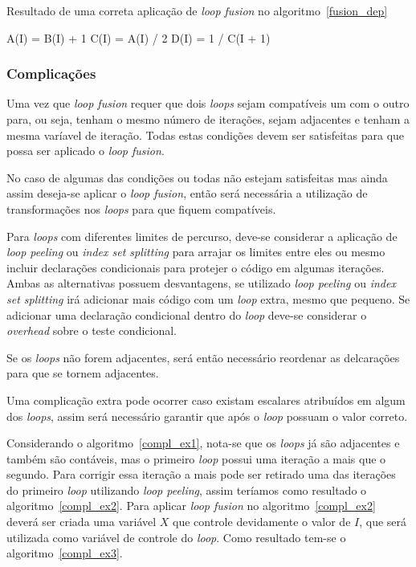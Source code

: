 \begin{algorithm}
\caption{Resultado de uma correta aplicação de \textit{loop fusion} no 
        algoritmo~\ref{fusion_dep}} 
\label{fusion_dep3}
\begin{algorithmic}[1]

\STATE A(I) = B(I) + 1
\STATE C(I) = A(I) / 2
\ENDFOR
{}
\STATE D(I) = 1 / C(I + 1)
\ENDFOR

\end{algorithmic}
\end{algorithm}


\subsubsection{Complicações}

Uma vez que \textit{loop fusion} requer que dois \textit{loops} sejam
compatíveis um com o outro para, ou seja, tenham o mesmo número de iterações,
sejam adjacentes e tenham a mesma varíavel de iteração.
Todas estas condições devem ser satisfeitas para que possa ser aplicado o
\textit{loop fusion}.

No caso de algumas das condições ou todas não estejam satisfeitas mas ainda
assim deseja-se aplicar o \textit{loop fusion}, então será necessária a
utilização de transformações nos \textit{loops} para que fiquem compatíveis.

Para \textit{loops} com diferentes limites de percurso, deve-se considerar a
aplicação de \textit{loop peeling} ou \textit{index set splitting} para arrajar
os limites entre eles ou mesmo incluir declarações condicionais para protejer o
código em algumas iterações.
Ambas as alternativas possuem desvantagens, se utilizado \textit{loop peeling}
ou \textit{index set splitting} irá adicionar mais código com um \textit{loop}
extra, mesmo que pequeno. Se adicionar uma declaração condicional dentro do
\textit{loop} deve-se considerar o \textit{overhead} sobre o teste condicional.

Se os \textit{loops} não forem adjacentes, será então necessário reordenar as
delcarações para que se tornem adjacentes.

Uma complicação extra pode ocorrer caso existam escalares atribuídos em algum
dos \textit{loops}, assim será necessário garantir que após o \textit{loop}
possuam o valor correto.

Considerando o algoritmo~\ref{compl_ex1}, nota-se que os \textit{loops} já são
adjacentes e também são contáveis, mas o primeiro \textit{loop} possui uma
iteração a mais que o segundo. Para corrigir essa iteração a mais pode ser
retirado uma das iterações do primeiro \textit{loop} utilizando 
\textit{loop peeling}, assim teríamos como resultado o algoritmo~\ref{compl_ex2}. 
Para aplicar \textit{loop fusion} no algoritmo~\ref{compl_ex2} deverá ser
criada uma variável $X$ que controle devidamente o valor de $I$, que será utilizada
como variável de controle do \textit{loop}. Como resultado tem-se o
algoritmo~\ref{compl_ex3}.

